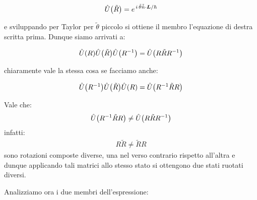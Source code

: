 \begin{align*}
	\hat{U}\qty(\tilde{R}) = e^{\, i  \,\tilde{\theta} \tilde{\hat{n}} \cdot \vb*{L}/ \hbar}
\end{align*}

	e sviluppando per Taylor per $\tilde{\theta}$ piccolo si ottiene il membro l'equazione di destra scritta prima. Dunque siamo arrivati a:
	
\begin{align*}
	  \hat{U}\qty(R)\hat{U}\qty(\tilde{R}) \hat{U}\qty(R^{-1}) = \hat{U}\qty(R\tilde{R}R^{-1})
\end{align*}

	chiaramente vale la stessa cosa se facciamo anche:

\begin{nb}
\begin{align*}
	  \hat{U}\qty(R^{-1})\hat{U}\qty(\tilde{R}) \hat{U}\qty(R) = \hat{U}\qty(R^{-1}\tilde{R}R)
\end{align*}
\end{nb}

\begin{myapprf}
	Vale che:
\begin{align*}
	\hat{U}\qty(R^{-1}\tilde{R}R) \neq \hat{U}\qty(R\tilde{R}R^{-1})
\end{align*}
	infatti:
\begin{align*}
	R\tilde{R} \neq \tilde{R}R
\end{align*}
	sono rotazioni composte diverse, una nel verso contrario rispetto all'altra e dunque applicando tali matrici allo stesso stato si ottengono due stati ruotati diversi.
\end{myapprf}

	Analizziamo ora i due membri dell'espressione:

